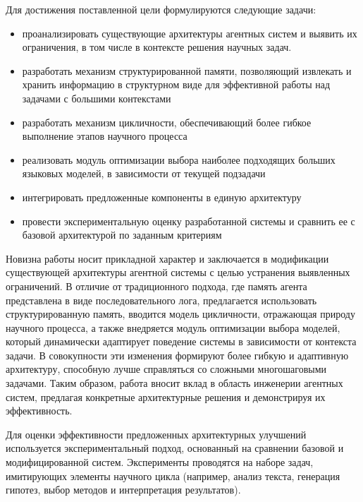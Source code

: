 Для достижения поставленной цели формулируются следующие задачи: 
\begin{itemize}
  \item проанализировать существующие архитектуры агентных систем и выявить их ограничения, в том числе в контексте решения научных задач. 

  \item разработать механизм структурированной памяти, позволяющий извлекать  и хранить информацию в структурном виде для эффективной работы над задачами с большими контекстами

  \item разработать механизм цикличности, обеспечивающий более гибкое выполнение этапов научного процесса

  \item реализовать модуль оптимизации выбора наиболее подходящих больших языковых моделей, в зависимости от текущей подзадачи

  \item интегрировать предложенные компоненты в единую архитектуру

  \item провести экспериментальную оценку разработанной системы и сравнить ее с базовой архитектурой по заданным критериям
\end{itemize}

Новизна работы носит прикладной характер и заключается в модификации существующей архитектуры агентной системы с целью устранения выявленных ограничений. В отличие от традиционного подхода, где память агента представлена в виде последовательного лога, предлагается использовать структурированную память, вводится модель цикличности, отражающая природу научного процесса, а также внедряется модуль оптимизации выбора моделей, который динамически адаптирует поведение системы в зависимости от контекста задачи. В совокупности эти изменения формируют более гибкую и адаптивную архитектуру, способную лучше справляться со сложными многошаговыми задачами. Таким образом, работа вносит вклад в область инженерии агентных систем, предлагая конкретные архитектурные решения и демонстрируя их эффективность.

Для оценки эффективности предложенных архитектурных улучшений используется экспериментальный подход, основанный на сравнении базовой и модифицированной систем. Эксперименты проводятся на наборе задач, имитирующих элементы научного цикла (например, анализ текста, генерация гипотез, выбор методов и интерпретация результатов). 

